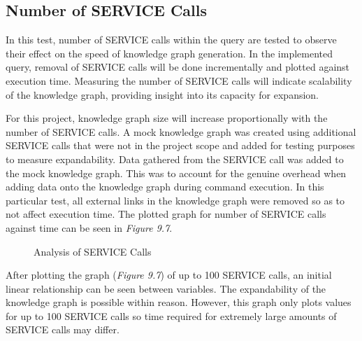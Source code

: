 \subsection{Number of SERVICE Calls}
\hspace{0.5cm} In this test, number of SERVICE calls within the query are tested to observe their effect on the speed of knowledge graph generation. In the implemented query, removal of SERVICE calls will be done incrementally and plotted against execution time. Measuring the number of SERVICE calls will indicate scalability of the knowledge graph, providing insight into its capacity for expansion.

For this project, knowledge graph size will increase proportionally with the number of SERVICE calls. A mock knowledge graph was created using additional SERVICE calls that were not in the project scope and added for testing purposes to measure expandability. Data gathered from the SERVICE call was added to the mock knowledge graph. This was to account for the genuine overhead when adding data onto the knowledge graph during command execution. In this particular test, all external links in the knowledge graph were removed so as to not affect execution time. The plotted graph for number of SERVICE calls against time can be seen in \textit{Figure 9.7}.


\begin{figure}[H]
\begin{center}
\end{center}
\vspace{-0.75cm}
\caption{Analysis of SERVICE Calls}
\end{figure}

After plotting the graph (\textit{Figure 9.7}) of up to 100 SERVICE calls, an initial linear relationship can be seen between variables. The expandability of the knowledge graph is possible within reason. However, this graph only plots values for up to 100 SERVICE calls so time required for extremely large amounts of SERVICE calls may differ. 
